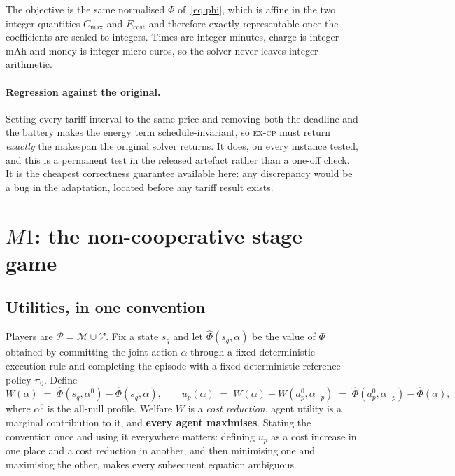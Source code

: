 \documentclass[preprint, 3p, review, 12pt]{elsarticle}
\theoremstyle{definition}
\begin{document}
The objective is the same normalised $\Phi$ of~\eqref{eq:phi}, which is affine in the two
integer quantities $C_{\max}$ and $E_{\mathrm{cost}}$ and therefore exactly representable
once the coefficients are scaled to integers. Times are integer minutes, charge is integer
mAh and money is integer micro-euros, so the solver never leaves integer arithmetic.

\paragraph{Regression against the original.} Setting every tariff interval to the same price
and removing both the deadline and the battery makes the energy term schedule-invariant, so
\textsc{ex-cp} must return \emph{exactly} the makespan the original solver returns. It does,
on every instance tested, and this is a permanent test in the released artefact rather than a
one-off check. It is the cheapest correctness guarantee available here: any discrepancy
would be a bug in the adaptation, located before any tariff result exists.

\section{$M1$: the non-cooperative stage game}
\label{sec:m1}

\subsection{Utilities, in one convention}
Players are $\mathcal{P}=\mathcal{M}\cup\mathcal{V}$. Fix a state $s_q$ and let
$\widehat{\Phi}(s_q,\alpha)$ be the value of $\Phi$ obtained by committing the joint action
$\alpha$ through a fixed deterministic execution rule and completing the episode with a fixed
deterministic reference policy $\pi_0$. Define
\begin{equation}
W(\alpha) \;=\; \widehat{\Phi}(s_q,\alpha^{0}) - \widehat{\Phi}(s_q,\alpha),
\qquad
u_p(\alpha) \;=\; W(\alpha) - W(a_p^{0},\alpha_{-p})
\;=\; \widehat{\Phi}(a_p^{0},\alpha_{-p}) - \widehat{\Phi}(\alpha),
\label{eq:utility}
\end{equation}
where $\alpha^{0}$ is the all-null profile. Welfare $W$ is a \emph{cost reduction}, agent
utility is a marginal contribution to it, and \textbf{every agent maximises}. Stating the
convention once and using it everywhere matters: defining $u_p$ as a cost increase in one
place and a cost reduction in another, and then minimising one and maximising the other,
makes every subsequent equation ambiguous.
\end{document}
